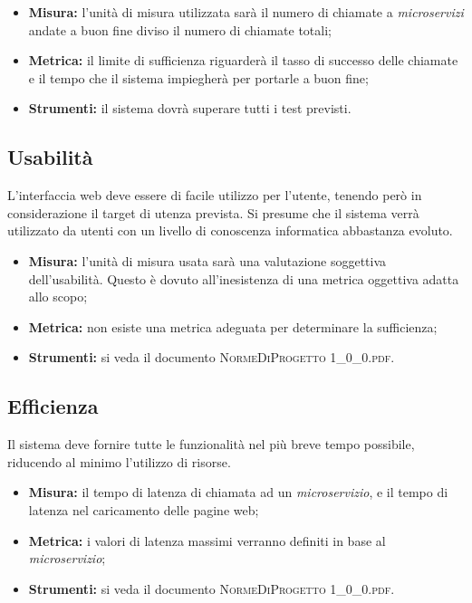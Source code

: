 		\begin{itemize}
			\item \textbf{Misura:} l'unità di misura utilizzata sarà il numero di chiamate a \textit{microservizi} andate a buon fine diviso il numero di chiamate totali;
			\item \textbf{Metrica: }il limite di sufficienza riguarderà il tasso di successo delle chiamate e il tempo che il sistema impiegherà per portarle a buon fine;
			\item \textbf{Strumenti: }il sistema dovrà superare tutti i test previsti.
			
		\end{itemize}
	
	\subsection{Usabilità}
		L’interfaccia web deve essere di facile utilizzo per l’utente, tenendo però in considerazione il target di utenza prevista. Si presume che il sistema verrà utilizzato da utenti con un livello di conoscenza informatica abbastanza evoluto. 
		
		\begin{itemize}
			\item \textbf{Misura: }l’unità di misura usata sarà una valutazione soggettiva dell’usabilità. Questo
			è dovuto all’inesistenza di una metrica oggettiva adatta allo scopo;
			\item \textbf{Metrica: }non esiste una metrica adeguata per determinare la sufficienza;
			\item \textbf{Strumenti: }si veda il documento \textsc{NormeDiProgetto 1\_0\_0.pdf}.
			
		\end{itemize}
	
	\subsection{Efficienza}
		Il sistema deve fornire tutte le funzionalità nel più breve tempo possibile, riducendo al minimo l’utilizzo di risorse.
		
		\begin{itemize}
			\item \textbf{Misura: }il tempo di latenza di chiamata ad un \textit{microservizio}, e il tempo di latenza nel caricamento delle pagine web;
			\item \textbf{Metrica: }i valori di latenza massimi verranno definiti in base al \textit{microservizio};
			\item \textbf{Strumenti: }si veda il documento \textsc{NormeDiProgetto 1\_0\_0.pdf}.
			
		\end{itemize}
	
